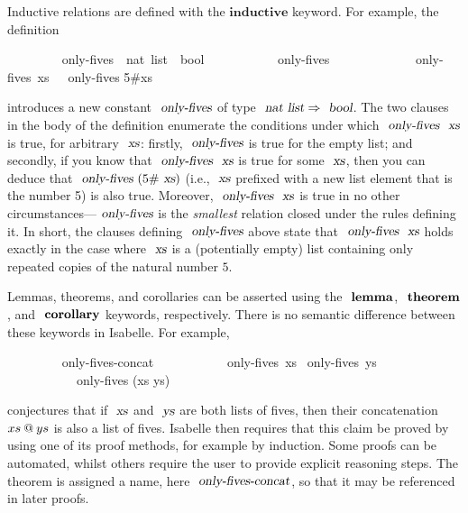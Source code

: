 Inductive relations are defined with the $\mathbf{inductive}$ keyword.
For example, the definition
\vspace{0.375em}
\begin{isabellebody}
\ \ \ \ \ \ \ \  only-fives\ {\isacharcolon}{\isacharcolon}\ {\isachardoublequoteopen}nat\ list\ {\isasymRightarrow}\ bool{\isachardoublequoteclose}\ \isanewline
\ \ \ \ \ \ \ \ \ \ {\isachardoublequoteopen}only-fives\ {\isacharbrackleft}{\isacharbrackright}{\isachardoublequoteclose}\ {\isacharbar}\isanewline
\ \ \ \ \ \ \ \ \ \ {\isachardoublequoteopen}{\isasymlbrakk}\ only-fives\ xs\ {\isasymrbrakk}\ {\isasymLongrightarrow}\ only-fives {\isacharparenleft}5\#xs{\isacharparenright}{\isachardoublequoteclose}
\end{isabellebody}
\vspace{0.375em}
\noindent
introduces a new constant $\isa{only-fives}$ of type $\isa{nat list} \Rightarrow \isa{bool}$.
The two clauses in the body of the definition enumerate the conditions under which $\isa{only-fives}\ \isa{xs}$ is true, for arbitrary $\isa{xs}$: firstly, $\isa{only-fives}$ is true for the empty list; and secondly, if you know that $\isa{only-fives}\ \isa{xs}$ is true for some $\isa{xs}$, then you can deduce that $\isa{only-fives}\ (5\#\isa{xs})$ (i.e., $\isa{xs}$ prefixed with a new list element that is the number 5) is also true.
Moreover, $\isa{only-fives}\ \isa{xs}$ is true in no other circumstances---$\isa{only-fives}$ is the \emph{smallest} relation closed under the rules defining it.
In short, the clauses defining $\isa{only-fives}$ above state that $\isa{only-fives}\ \isa{xs}$ holds exactly in the case where $\isa{xs}$ is a (potentially empty) list containing only repeated copies of the natural number $5$.

Lemmas, theorems, and corollaries can be asserted using the $\isacommand{lemma}$, $\isacommand{theorem}$, and $\isacommand{corollary}$ keywords, respectively.
There is no semantic difference between these keywords in Isabelle.
For example,
\vspace{0.375em}
\begin{isabellebody}
\ \ \ \ \ \ \ \  only-fives-concat{\isacharcolon}\isanewline
\ \ \ \ \ \ \ \ \ \ \ only-fives\ xs \ only-fives\ ys \isanewline
\ \ \ \ \ \ \ \ \ \ \ only-fives (xs \isacharat ys)
\end{isabellebody}
\vspace{0.375em}
\noindent
conjectures that if $\isa{xs}$ and $\isa{ys}$ are both lists of fives, then their concatenation $xs \mathbin{\emph{$@$}} ys$ is also a list of fives.
Isabelle then requires that this claim be proved by using one of its proof methods, for example by induction.
Some proofs can be automated, whilst others require the user to provide explicit reasoning steps.
The theorem is assigned a name, here $\isa{only-fives-concat}$, so that it may be referenced in later proofs.


